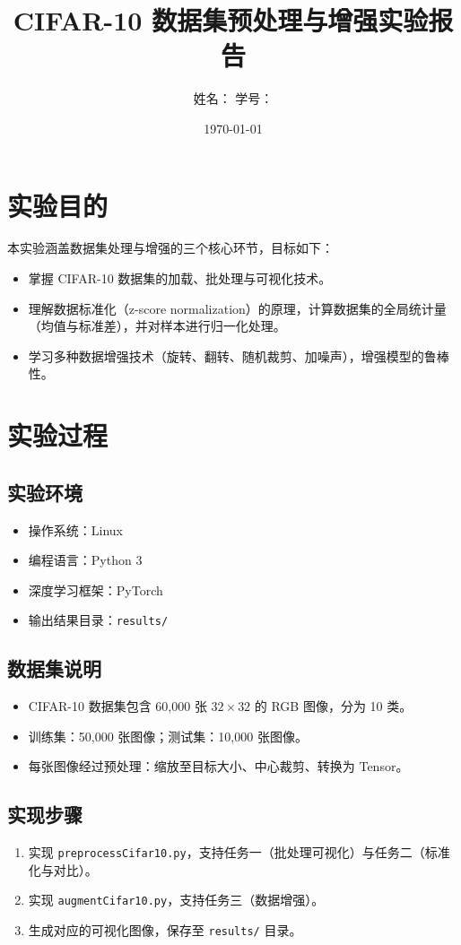 \documentclass[12pt,a4paper]{ctexart}
\title{CIFAR-10 数据集预处理与增强实验报告}
\author{姓名：\underline{\hspace{3cm}} \quad 学号：\underline{\hspace{3cm}}}
\date{\today}
\begin{document}
\maketitle

\section{实验目的}
本实验涵盖数据集处理与增强的三个核心环节，目标如下：
\begin{itemize}
  \item 掌握 CIFAR-10 数据集的加载、批处理与可视化技术。
  \item 理解数据标准化（z-score normalization）的原理，计算数据集的全局统计量（均值与标准差），并对样本进行归一化处理。
  \item 学习多种数据增强技术（旋转、翻转、随机裁剪、加噪声），增强模型的鲁棒性。
\end{itemize}

\section{实验过程}
\subsection{实验环境}
\begin{itemize}
  \item 操作系统：Linux
  \item 编程语言：Python 3
  \item 深度学习框架：PyTorch
  \item 输出结果目录：\texttt{results/}
\end{itemize}

\subsection{数据集说明}
\begin{itemize}
  \item CIFAR-10 数据集包含 60,000 张 $32\times 32$ 的 RGB 图像，分为 10 类。
  \item 训练集：50,000 张图像；测试集：10,000 张图像。
  \item 每张图像经过预处理：缩放至目标大小、中心裁剪、转换为 Tensor。
\end{itemize}

\subsection{实现步骤}
\begin{enumerate}
  \item 实现 \texttt{preprocessCifar10.py}，支持任务一（批处理可视化）与任务二（标准化与对比）。
  \item 实现 \texttt{augmentCifar10.py}，支持任务三（数据增强）。
  \item 生成对应的可视化图像，保存至 \texttt{results/} 目录。
\end{enumerate}
\end{document}
